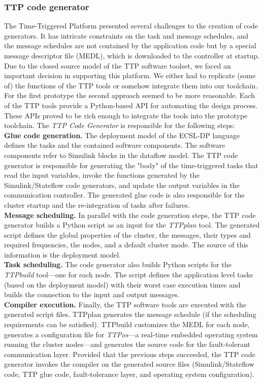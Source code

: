 \subsubsection{TTP code generator}
The Time-Triggered Platform presented several challenges to the creation of code
generators. It has intricate constraints on the task and message
schedules, and the message schedules are not contained by the
application code but by a special message descriptor file (MEDL), which
is downloaded to the controller at startup. Due to the closed source
model of the TTP software toolset, we faced an important decision in
supporting this platform. We either had to replicate (some of) the
functions of the TTP tools or somehow integrate them into our toolchain.
For the first prototype the second approach seemed to be more
reasonable. Each of the TTP tools provide a Python-based API for
automating the design process. These APIs proved to be rich enough
to integrate the tools into the prototype toolchain. The \emph{TTP
Code Generator} is responsible for the following steps:\\
\textbf{Glue code generation.} The deployment model of the ECSL-DP
  language defines the tasks and the contained software
  components. The software components refer to Simulink blocks
  in the dataflow model. The TTP code generator is responsible
  for generating the "body" of the time-triggered tasks that read
  the input variables, invoke the functions generated
  by the Simulink/Stateflow code generators, and update the
  output variables in the communication controller. The
  generated glue code is also responsible for the cluster
  startup and the re-integration of tasks after failures.\\
  \textbf{Message scheduling.} In parallel with the code generation
  steps, the TTP code generator builds a Python script as an
  input for the \emph{TTPplan} tool. The generated script
  defines the global properties of the cluster, the messages,
  their types and required frequencies, the nodes, and a default
  cluster mode. The source of this information is the deployment
  model.\\
  \textbf{Task scheduling.} The code generator also builds Python
  scripts for the \emph{TTPbuild} tool---one for each node. The
  script defines the application level tasks (based on the
  deployment model) with their worst case execution times and builds
  the connection to the input and output messages.\\
  \textbf{Compiler execution.} Finally, the TTP software tools are
  executed with the generated script files. TTPplan generates
  the message schedule (if the scheduling requirements can be
  satisfied). TTPbuild customizes the MEDL for each node,
  generates a configuration file for \emph{TTPos}---a real-time
  embedded operating system running the cluster nodes---and generates the
  source code for the fault-tolerant communication layer.
  Provided that the previous steps succeeded, the TTP code
  generator invokes the compiler on the generated source files
  (Simulink/Stateflow code, TTP glue code, fault-tolerance layer,
  and operating system configuration).\\

